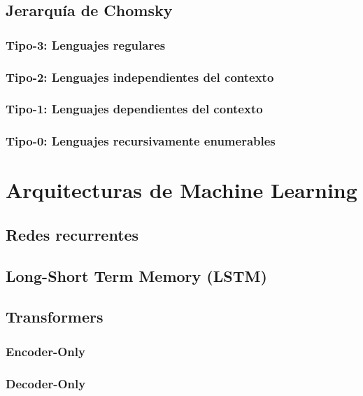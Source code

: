 \vsp


\subsection{Jerarquía de Chomsky}

\subsubsection{Tipo-3: Lenguajes regulares}

\subsubsection{Tipo-2: Lenguajes independientes del contexto}

\subsubsection{Tipo-1: Lenguajes dependientes del contexto}

\subsubsection{Tipo-0: Lenguajes recursivamente enumerables}

\section{Arquitecturas de Machine Learning}


\subsection{Redes recurrentes}

\subsection{Long-Short Term Memory (LSTM)}

\subsection{Transformers}

\subsubsection{Encoder-Only}

\subsubsection{Decoder-Only}
